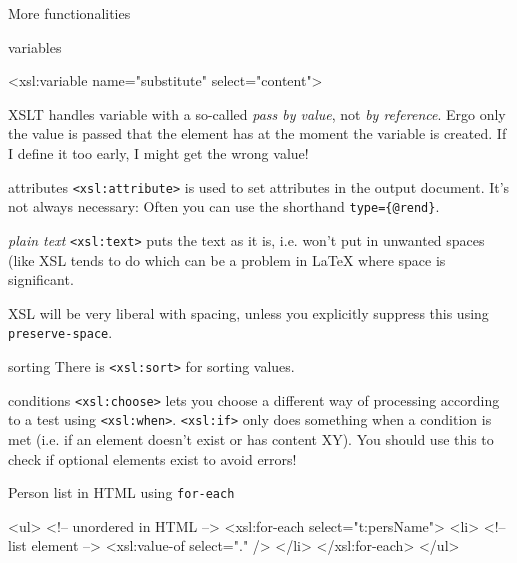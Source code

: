 \begin{frame}{More functionalities}
\small
\begin{block}{variables}
\begin{xmlcode}
<xsl:variable name="substitute" select="content">
\end{xmlcode}
XSLT handles variable with a so-called \emph{pass by value}, not \emph{by reference}. Ergo only the value is passed that the element has at the moment the variable is created. If I define it too early, I might get the wrong value! 
\end{block} 

\begin{block}{attributes}
\texttt{<xsl:attribute>} is used to set attributes in the output document. It's not always necessary: Often you can use the shorthand \verb|type={@rend}|.
\end{block} 

\framebreak

\begin{block}{\emph{plain text}}
\texttt{<xsl:text>} puts the text as it is, i.e. won't put in unwanted spaces (like XSL tends to do which can be a problem in \LaTeX{} where space is significant. 

XSL will be very liberal with spacing, unless you explicitly suppress this using \texttt{preserve-space}.
\end{block} 

\begin{block}{sorting}
There is \texttt{<xsl:sort>} for sorting values.
\end{block} 

\begin{block}{conditions}
\alert{\texttt{<xsl:choose>}} lets you choose a different way of processing according to a test using \alert{\texttt{<xsl:when>}}. \alert{\texttt{<xsl:if>}} only does something when a condition is met (i.e. if an element doesn't exist or has content XY). You should use this to check if optional elements exist to avoid errors!
\end{block}

\framebreak

\begin{block}{Person list in HTML using \texttt{for-each}}
\begin{xmlcode}
<ul> <!-- unordered in HTML -->
<xsl:for-each select="t:persName">
    <li> <!-- list element -->
    <xsl:value-of select="." />
    </li>
</xsl:for-each>
</ul>
\end{xmlcode}
\end{block}


\end{frame}
